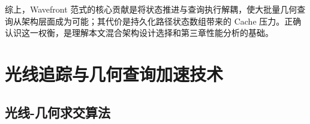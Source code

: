 综上，Wavefront 范式的核心贡献是将状态推进与查询执行解耦，使大批量几何查询从架构层面成为可能；其代价是持久化路径状态数组带来的 Cache 压力。正确认识这一权衡，是理解本文混合架构设计选择和第三章性能分析的基础。

\section{光线追踪与几何查询加速技术}

\subsection{光线-几何求交算法}

